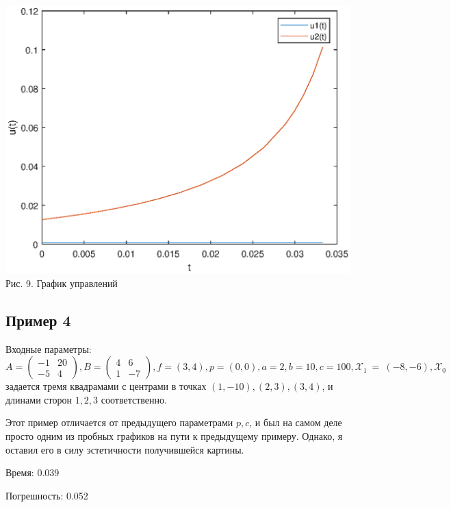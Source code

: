\documentclass{article}
\theoremstyle{definition}
\begin{document}
\begin{center}
{\includegraphics[width=15cm]{uexample3.eps}}
{Рис. 9. График управлений}
\end{center}

\newpage

\subsection{Пример 4}

Входные параметры: $A = \begin{pmatrix} -1 & 20 \\ -5 & 4\end{pmatrix}, B = \begin{pmatrix} 4 & 6 \\ 1 & -7\end{pmatrix}, 
f = (3, 4), p = (0,0), a = 2, b = 10, c = 100, \mathcal{X}_1~=~(-8,-6), \mathcal{X}_0$
 задается тремя квадрамами с центрами в точках $(1, -10), (2,3), (3,4)$,
и длинами сторон $1, 2, 3$ соответственно.

Этот пример отличается от предыдущего параметрами $p, c$, и был на самом деле просто одним из пробных графиков на пути к 
предыдущему примеру. Однако, я оставил его в силу эстетичности получившейся картины.

Время: 0.039

Погрешность: 0.052
\end{document}
